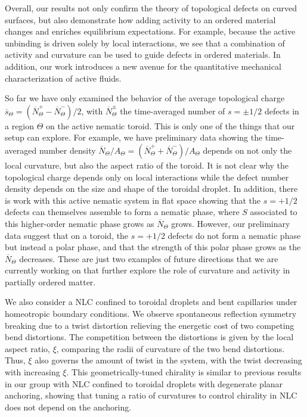 Overall, our results not only confirm the theory of topological defects on curved surfaces, but also demonstrate how adding activity to an ordered material changes and enriches equilibrium expectations.
For example, because the active unbinding is driven solely by local interactions, we see that a combination of activity and curvature can be used to guide defects in ordered materials.
In addition, our work introduces a new avenue for the quantitative mechanical characterization of active fluids.

So far we have only examined the behavior of the average topological charge $\overbar{s}_{\Theta} = (\overbar{N}^{+}_{\Theta} - \overbar{N}^{-}_{\Theta})/2$, with $\overbar{N}^{\pm}_{\Theta}$ the time-averaged number of $s = \pm1/2$ defects in a region $\Theta$ on the active nematic toroid.
This is only one of the things that our setup can explore.
For example, we have preliminary data showing the time-averaged number density $\overbar{N}_{\Theta}/A_{\Theta} = (\overbar{N}^{+}_{\Theta} + \overbar{N}^{-}_{\Theta})/A_{\Theta}$ depends on not only the local curvature, but also the aspect ratio of the toroid.
It is not clear why the topological charge depends only on local interactions while the defect number density depends on the size and shape of the toroidal droplet.
In addition, there is work with this active nematic system in flat space showing that the $s = +1/2$ defects can themselves assemble to form a nematic phase, where $S$ associated to this higher-order nematic phase grows as $\overbar{N}_{\Theta}$ grows.
However, our preliminary data suggest that on a toroid, the $s = +1/2$ defects do not form a nematic phase but instead a polar phase, and that the strength of this polar phase grows as the $\overbar{N}_{\Theta}$ decreases.
These are just two examples of future directions that we are currently working on that further explore the role of curvature and activity in partially ordered matter.

We also consider a NLC confined to toroidal droplets and bent capillaries under homeotropic boundary conditions.
We observe spontaneous reflection symmetry breaking due to a twist distortion relieving the energetic cost of two competing bend distortions.
The competition between the distortions is given by the local aspect ratio, $\xi$, comparing the radii of curvature of the two bend distortions.
Thus, $\xi$ also governs the amount of twist in the system, with the twist decreasing with increasing $\xi$.
This geometrically-tuned chirality is similar to previous results in our group with NLC confined to toroidal droplets with degenerate planar anchoring, showing that tuning a ratio of curvatures to control chirality in NLC does not depend on the anchoring.

